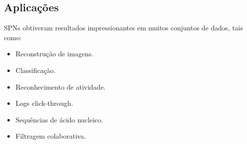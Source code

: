 \documentclass[a4paper,10pt]{article}
\theoremstyle{plain}
\begin{document}
\subsection{Aplicações}

SPNs obtiveram resultados impressionantes em muitos conjuntos de dados, tais como:

\begin{itemize} \itemsep0pt
  \item Reconstrução de imagens.
  \item Classificação.
  \item Reconhecimento de atividade.
  \item Logs click-through.
  \item Sequências de ácido nucleico.
  \item Filtragem colaborativa.
\end{itemize}
\end{document}
